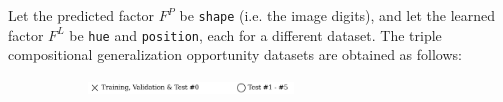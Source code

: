 \begin{definition}
\begin{figure}[H]
\begin{subfigure}[b]{0.45\textwidth}
\begin{subfigure}[b]{0.48\textwidth}
            \end{subfigure}
        \end{subfigure}
    \end{figure}
\end{definition}


\begin{definition}\label{def:3_cgo_experiments}
    Let the predicted factor $F^P$ be \texttt{shape} (i.e. the image digits), and let the 
    learned factor $F^L$ be \texttt{hue} and \texttt{position}, each for a different dataset. The 
    triple compositional generalization opportunity datasets are obtained as follows:

    \begin{figure}[H]
        \centering
        \begin{subfigure}[b]{\textwidth}
            \centering
            \includegraphics[width=0.6\textwidth]{img/datasets/_legend.pdf}
        \end{subfigure}
        \vspace{-0.2cm} %


\end{figure}
\end{definition}
